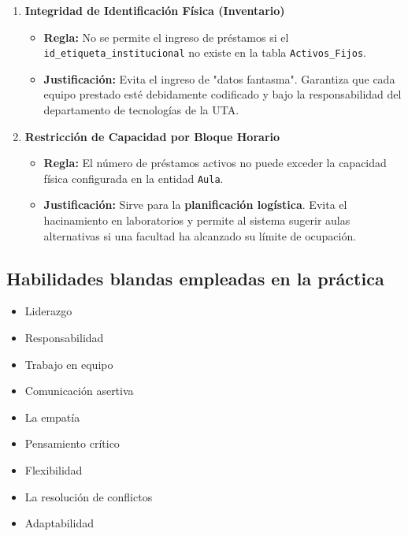 \documentclass{article}
\begin{document}
\begin{enumerate}
    \item \textbf{Integridad de Identificación Física (Inventario)}
    \begin{itemize}
        \item \textbf{Regla:} No se permite el ingreso de préstamos si el \texttt{id\_etiqueta\_institucional} no existe en la tabla \texttt{Activos\_Fijos}.
        \item \textbf{Justificación:} Evita el ingreso de "datos fantasma". Garantiza que cada equipo prestado esté debidamente codificado y bajo la responsabilidad del departamento de tecnologías de la UTA.
    \end{itemize}

    \item \textbf{Restricción de Capacidad por Bloque Horario}
    \begin{itemize}
        \item \textbf{Regla:} El número de préstamos activos no puede exceder la capacidad física configurada en la entidad \texttt{Aula}.
        \item \textbf{Justificación:} Sirve para la \textbf{planificación logística}. Evita el hacinamiento en laboratorios y permite al sistema sugerir aulas alternativas si una facultad ha alcanzado su límite de ocupación.
    \end{itemize}
\end{enumerate}
\subsection{Habilidades blandas empleadas en la práctica}

\begin{itemize}
    \item[$\square$]  Liderazgo
    \item[$\square$]  Responsabilidad
    \item[$\checkmark$] Trabajo en equipo
    \item[$\square$] Comunicación asertiva
    \item[$\square$] La empatía
    \item[$\square$]  Pensamiento crítico
    \item[$\square$] Flexibilidad
    \item[$\square$] La resolución de conflictos
    \item[$\square$] Adaptabilidad
\end{itemize}
\end{document}
